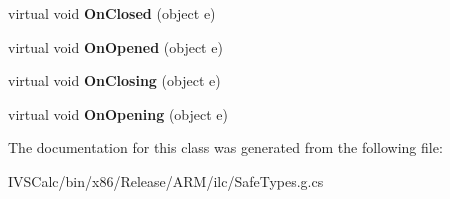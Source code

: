 \begin{DoxyCompactItemize}
virtual void {\bfseries On\+Closed} (object e)
\item 
\mbox{\label{class_windows_1_1_u_i_1_1_xaml_1_1_controls_1_1_app_bar_a18123ce9aaadbaedcf6261367a261e24}} 
virtual void {\bfseries On\+Opened} (object e)
\item 
\mbox{\label{class_windows_1_1_u_i_1_1_xaml_1_1_controls_1_1_app_bar_add6f772cf567a9cfcd0e536e1d39bd96}} 
virtual void {\bfseries On\+Closing} (object e)
\item 
\mbox{\label{class_windows_1_1_u_i_1_1_xaml_1_1_controls_1_1_app_bar_a5d877ca7226d9cf2eb8c2a285cfcebe1}} 
virtual void {\bfseries On\+Opening} (object e)
\end{DoxyCompactItemize}


The documentation for this class was generated from the following file\+:\begin{DoxyCompactItemize}
\item 
I\+V\+S\+Calc/bin/x86/\+Release/\+A\+R\+M/ilc/Safe\+Types.\+g.\+cs\end{DoxyCompactItemize}
